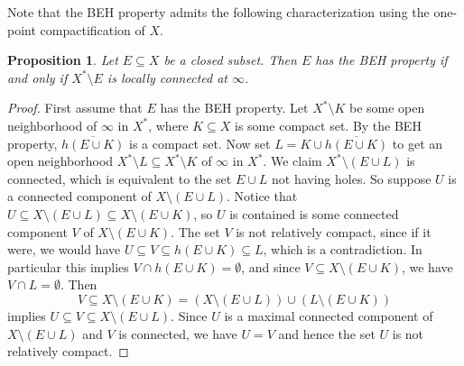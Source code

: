 \documentclass[a4paper,11pt]{amsart}
\newtheorem{proposition}{Proposition}
\begin{document}
Note that the BEH property admits the following characterization using the one-point compactification of $X$.

\begin{proposition}\label{locallyconnected}
    Let $E \subseteq X$ be a closed subset. 
    Then $E$ has the BEH property if and only if $X^*\setminus E$ is locally connected at $\infty$.
\end{proposition}

\begin{proof}
    First assume that $E$ has the BEH property. 
    Let $X^* \setminus K$ be some open neighborhood of $\infty$ in $X^*$, where $K \subseteq X$ is some compact set.
    By the BEH property, $\overline{h(E \cup K)}$ is a compact set. 
    Now set $L = K \cup \overline{h(E \cup K)}$ to get an open neighborhood $X^*\setminus L \subseteq X^*\setminus K$ of $\infty$ in $X^*$.
    We claim $X^* \setminus (E \cup L)$ is connected, which is equivalent to the set $E \cup L$ not having holes.
    So suppose $U$ is a connected component of $X \setminus (E \cup L)$.
    Notice that $U \subseteq X \setminus (E \cup L) \subseteq  X \setminus (E \cup K)$, so $U$ is contained is some connected component $V$ of $X \setminus (E \cup K)$.
    The set $V$ is not relatively compact, since if it were, we would have $U \subseteq V \subseteq h(E \cup K) \subseteq L$, which is a contradiction.
    In particular this implies $V \cap h(E \cup K) = \emptyset$, and since $V \subseteq X \setminus (E \cup K)$, we have $V \cap L = \emptyset$.
    Then
    \[V \subseteq X \setminus (E \cup K) = (X \setminus (E \cup L)) \cup (L \setminus (E \cup K))\]
    implies $U \subseteq V \subseteq X \setminus (E \cup L)$. 
    Since $U$ is a maximal connected component of $X \setminus (E \cup L)$ and $V$ is connected, we have $U = V$ and hence the set $U$ is not relatively compact.


\end{proof}
\end{document}
